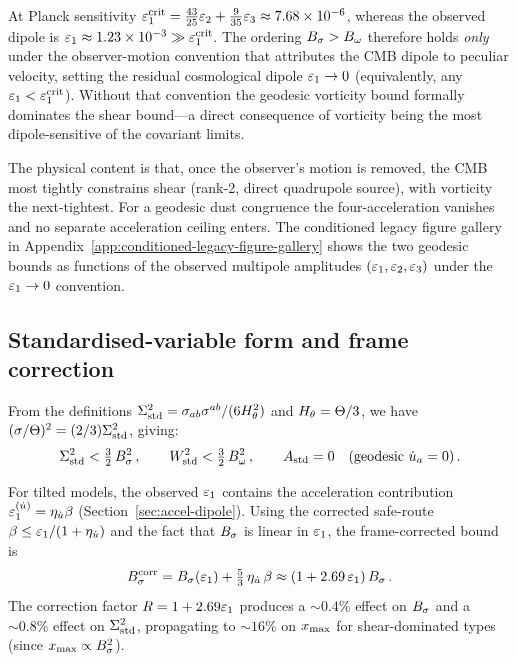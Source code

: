 \begin{remark}
\label{rem:lower-degeneracy}
At Planck sensitivity $\varepsilon_1^{\mathrm{crit}} = \tfrac{43}{25}\varepsilon_2 +
\tfrac{9}{35}\varepsilon_3 \approx 7.68\times10^{-6}$, whereas the observed
dipole is $\varepsilon_1 \approx 1.23\times10^{-3} \gg \varepsilon_1^{\mathrm{crit}}$.
The ordering $B_\sigma > B_\omega$ therefore holds \emph{only} under the
observer-motion convention that attributes the CMB dipole to peculiar
velocity, setting the residual cosmological dipole $\varepsilon_1 \to 0$
(equivalently, any $\varepsilon_1 < \varepsilon_1^{\mathrm{crit}}$).  Without that
convention the geodesic vorticity bound formally dominates the shear
bound---a direct consequence of vorticity being the most
dipole-sensitive of the covariant limits.
\end{remark}

The physical content is that, once the observer's motion is removed, the
CMB most tightly constrains shear (rank-2, direct quadrupole source),
with vorticity the next-tightest.  For a geodesic dust congruence the
four-acceleration vanishes and no separate acceleration ceiling
enters.  The conditioned legacy figure gallery in
Appendix~\ref{app:conditioned-legacy-figure-gallery} shows the two
geodesic bounds as functions of the observed multipole amplitudes
$(\varepsilon_1, \varepsilon_2, \varepsilon_3)$ under the $\varepsilon_1 \to 0$ convention.


\subsection{Standardised-variable form and frame correction}
\label{sec:std-form}

From the definitions $\Sigma^2_{\mathrm{std}} = \sigma_{ab}\sigma^{ab}/(6H_\theta^2)$
and $H_\theta = \Theta/3$, we have
$(\sigma/\Theta)^2 = (2/3)\Sigma^2_{\mathrm{std}}$, giving:
\begin{equation}\label{eq:Sig2-from-Bsig}
\Sigma^2_{\mathrm{std}} < \tfrac{3}{2}\,B_\sigma^2\,,\qquad
W^2_{\mathrm{std}} < \tfrac{3}{2}\,B_\omega^2\,,\qquad
A_{\mathrm{std}} = 0 \quad(\text{geodesic } \dot{u}_a = 0)\,.
\end{equation}

For tilted models, the observed $\varepsilon_1$ contains the
acceleration contribution
$\varepsilon_1^{(\dot{u})} = \eta_{\dot{u}}\beta$
(Section~\ref{sec:accel-dipole}).  Using the corrected
safe-route $\beta \leq \varepsilon_1/(1 + \eta_{\dot{u}})$ and the fact that
$B_\sigma$ is linear in $\varepsilon_1$, the frame-corrected bound is
\begin{equation}\label{eq:Bsig-corr}
B_\sigma^{\mathrm{corr}}
= B_\sigma(\varepsilon_1) + \tfrac{5}{3}\,\eta_{\dot{u}}\,\beta
\approx (1 + 2.69\,\varepsilon_1)\,B_\sigma\,.
\end{equation}
The correction factor $R = 1 + 2.69\varepsilon_1$ produces a
$\sim 0.4\%$ effect on $B_\sigma$ and a $\sim 0.8\%$ effect on
$\Sigma^2_{\mathrm{std}}$, propagating to $\sim 16\%$ on $x_{\max}$ for
shear-dominated types (since $x_{\max} \propto B_\sigma^2$).

